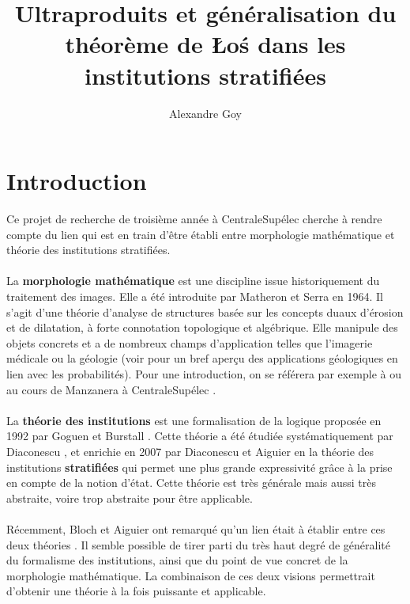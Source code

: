 \documentclass[11pt,a4paper]{report}
\title{Ultraproduits et généralisation du théorème de \L o\'s dans les institutions stratifiées}
\author{Alexandre Goy}
\newcommand{\gr}{\textbf}
\newcommand{\1}{\mathbbm{1}}
\begin{document}
\maketitle
\tableofcontents
\newpage
\chapter*{Introduction}
Ce projet de recherche de troisième année à CentraleSupélec cherche à rendre compte du lien qui est en train d'être établi entre morphologie mathématique et théorie des institutions stratifiées.\\\\
La \gr{morphologie mathématique} est une discipline issue historiquement du traitement des images. Elle a été introduite par Matheron et Serra en 1964. Il s'agit d'une théorie d'analyse de structures basée sur les concepts duaux d'érosion et de dilatation, à forte connotation topologique et algébrique. Elle manipule des objets concrets et a de nombreux champs d'application telles que l'imagerie médicale ou la géologie (voir \cite{Lan93} pour un bref aperçu des applications géologiques en lien avec les probabilités). Pour une introduction, on se référera par exemple à \cite{Blo07} ou au cours de Manzanera à CentraleSupélec \cite{Man18}.\\\\
La \gr{théorie des institutions} est une formalisation de la logique proposée en 1992 par Goguen et Burstall \cite{Gog92}. Cette théorie a été étudiée systématiquement par Diaconescu \cite{Dia08}, et enrichie en 2007 par Diaconescu et Aiguier en la théorie des institutions \gr{stratifiées} \cite{Aig07} qui permet une plus grande expressivité grâce à la prise en compte de la notion d'état. Cette théorie est très générale mais aussi très abstraite, voire trop abstraite pour être applicable.\\\\
Récemment, Bloch et Aiguier ont remarqué qu'un lien était à établir entre ces deux théories \cite{Aig17}. Il semble possible de tirer parti du très haut degré de généralité du formalisme des institutions, ainsi que du point de vue concret de la morphologie mathématique. La combinaison de ces deux visions permettrait d'obtenir une théorie à la fois puissante et applicable.\\\\
\end{document}
